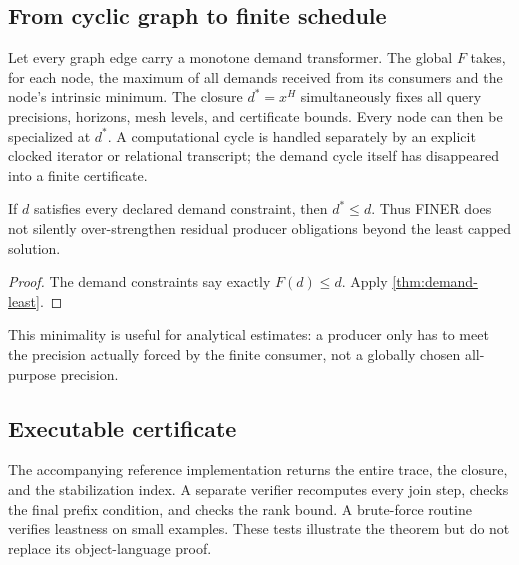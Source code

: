 \subsection{From cyclic graph to finite schedule}

Let every graph edge carry a monotone demand transformer.  The global \(F\) takes, for each node, the maximum of all demands received from its consumers and the node's intrinsic minimum.  The closure \(d^*=x^H\) simultaneously fixes all query precisions, horizons, mesh levels, and certificate bounds.  Every node can then be specialized at \(d^*\).  A computational cycle is handled separately by an explicit clocked iterator or relational transcript; the demand cycle itself has disappeared into a finite certificate.

\begin{corollary}
If \(d\) satisfies every declared demand constraint, then \(d^*\leq d\).  Thus FINER does not silently over-strengthen residual producer obligations beyond the least capped solution.
\end{corollary}

\begin{proof}
The demand constraints say exactly \(F(d)\leq d\).  Apply \cref{thm:demand-least}.
\end{proof}

This minimality is useful for analytical estimates: a producer only has to meet the precision actually forced by the finite consumer, not a globally chosen all-purpose precision.

\subsection{Executable certificate}

The accompanying reference implementation returns the entire trace, the closure, and the stabilization index.  A separate verifier recomputes every join step, checks the final prefix condition, and checks the rank bound.  A brute-force routine verifies leastness on small examples.  These tests illustrate the theorem but do not replace its object-language proof.

